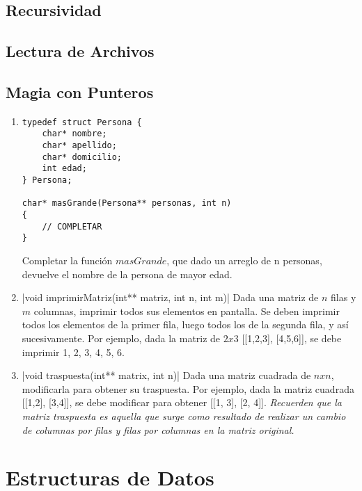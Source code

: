 \documentclass[titlepage,oneside]{book}
\begin{document}
\chapter{Recursividad}

\chapter{Lectura de Archivos}

\chapter{Magia con Punteros}

\begin{enumerate}

    \item\begin{verbatim}
typedef struct Persona {
    char* nombre;
    char* apellido;
    char* domicilio;
    int edad;
} Persona;

char* masGrande(Persona** personas, int n)
{
    // COMPLETAR
}
    \end{verbatim}

    Completar la función $masGrande$, que dado un arreglo de n personas, devuelve el nombre de la persona de mayor edad.

    \item {}|void imprimirMatriz(int** matriz, int n, int m)|
    Dada una matriz de $n$ filas y $m$ columnas, imprimir todos sus elementos en pantalla. Se deben imprimir todos los elementos de la primer fila, luego todos los de la segunda fila, y así sucesivamente. Por ejemplo, dada la matriz de $2x3$ [[1,2,3], [4,5,6]], se debe imprimir 1, 2, 3, 4, 5, 6.
    
    \item {}|void traspuesta(int** matrix, int n)|
    Dada una matriz cuadrada de $nxn$, modificarla para obtener su traspuesta. Por ejemplo, dada la matriz cuadrada [[1,2], [3,4]], se debe modificar para obtener [[1, 3], [2, 4]]. \textit{Recuerden que la matriz traspuesta es aquella que surge como resultado de realizar un cambio de columnas por filas y filas por columnas en la matriz original.}
    
\end{enumerate}


\part{Estructuras de Datos}
\end{document}
